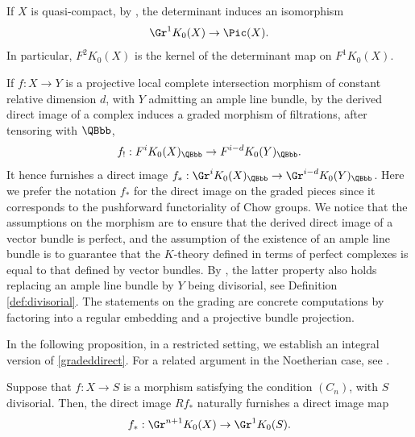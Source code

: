 If $X$ is quasi-compact, by \cite[Exp.\,X, Th.\,5.3.2]{SGA6}, the determinant induces an isomorphism
\begin{equation}\label{iso:GR1}
\Gr^1 K_0(X)\to \Pic(X).
\end{equation}
In particular, $F^{2}K_{0}(X)$ is the kernel of the determinant map on $F^{1}K_{0}(X)$.

If $f: X \to Y$ is a projective local complete intersection morphism of constant relative dimension $d$, with $Y$ admitting an ample line bundle, by \cite[Exp.\,VIII, Prop.\,3.2]{SGA6} the derived direct image of a complex induces a graded morphism of filtrations, after tensoring with $\QBbb$,
\begin{equation}\label{gradeddirect}
f_!: F^i K_0(X)_\QBbb \to F^{i-d}K_0(Y)_\QBbb.
\end{equation}
It hence furnishes a direct image $f_\ast: \Gr^iK_0(X)_{\QBbb}\to \Gr^{i-d}K_0(Y)_\QBbb$. Here we prefer the notation $f_{\ast}$ for the direct image on the graded pieces since it corresponds to the pushforward functoriality of Chow groups. We notice that the assumptions on the morphism are to ensure that the derived direct image of a vector bundle is perfect, and the assumption of the existence of an ample line bundle is to guarantee that the $K$-theory defined in terms of perfect complexes is equal to that defined by vector bundles. By \cite[Prop.\,3.10]{ThomasonTrobaugh}, the latter property also holds replacing an ample line bundle by $Y$ being divisorial, see Definition \ref{def:divisorial}. The statements on the grading are concrete computations by factoring into a regular embedding and a projective bundle projection.

In the following proposition, in a restricted setting, we establish an integral version of \eqref{gradeddirect}. For a related argument in the Noetherian case, see \cite[Prop.\,2.25]{Nakayamaintsheaves}.

\begin{proposition}\label{prop:directimageK}
Suppose that $f: X\to S$ is a morphism satisfying the condition $(C_n)$, with $S$ divisorial. Then, the direct image $Rf_\ast$ naturally furnishes a direct image map\vspace*{-3pt}
\begin{displaymath} f_\ast : \Gr^{n+1} K_0(X) \to \Gr^1 K_0(S).
\end{displaymath}
\end{proposition}

